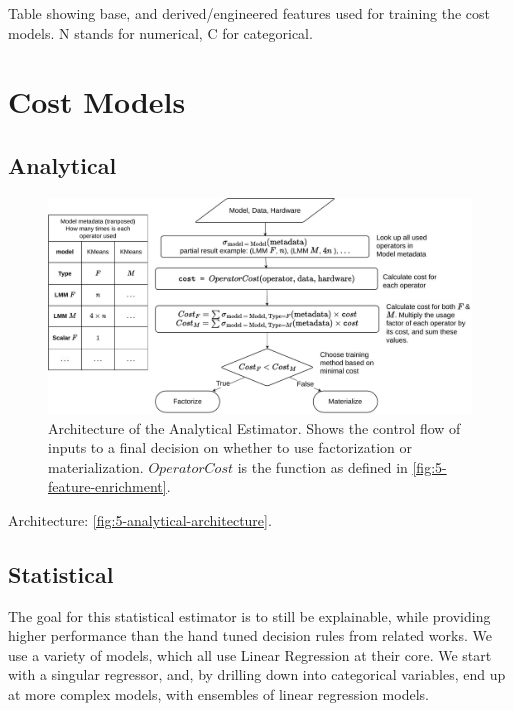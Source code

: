 \begin{table}[ht]
    \centering
    
    \caption[Feature table]{Table showing base, and derived/engineered features used for training the cost models. N stands for numerical, C for categorical.}
    \label{tab:5-features}
\end{table}


\section{Cost Models}
\label{sec:5-cost-models}



\subsection{Analytical}
\begin{figure}[ht]
    \centering
    \includegraphics[width=\linewidth]{chapters/05_cost_estimation/figures/analytical-architecture.pdf}
    \caption[Analytical Estimator Architecture]{Architecture of the Analytical Estimator. Shows the control flow of inputs to a final decision on whether to use factorization or materialization. $OperatorCost$ is the function as defined in \autoref{fig:5-feature-enrichment}.}
    \label{fig:5-analytical-architecture}
\end{figure}

Architecture: \autoref{fig:5-analytical-architecture}.

\subsection{Statistical}
The goal for this statistical estimator is to still be explainable, while providing higher performance than the hand tuned decision rules from related works. We use a variety of models, which all use Linear Regression at their core. We start with a singular regressor, and, by drilling down into categorical variables, end up at more complex models, with ensembles of linear regression models.

